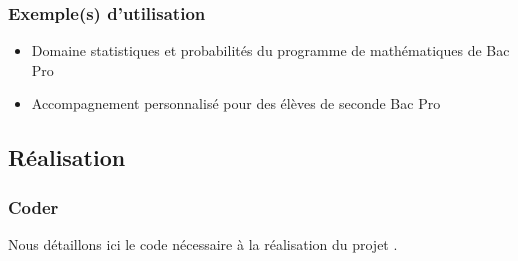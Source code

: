 \documentclass[letterpaper,10pt,french]{sphinxmanual}
\begin{document}
\subsubsection{Exemple(s) d’utilisation}
\label{\detokenize{projets/galton:exemple-s-d-utilisation}}\begin{itemize}
\item {} 
Domaine statistiques et probabilités du programme de mathématiques de Bac Pro

\item {} 
Accompagnement personnalisé pour des élèves de seconde Bac Pro

\end{itemize}


\subsection{Réalisation}
\label{\detokenize{projets/galton:realisation}}
\ignorespaces 

\subsubsection{Coder}
\label{\detokenize{projets/galton-coder:index-0}}\label{\detokenize{projets/galton-coder:coder}}\label{\detokenize{projets/galton-coder::doc}}
Nous détaillons ici le code nécessaire à la réalisation
du projet {\hyperref[\detokenize{projets/galton:projetgalton}]{}}.
\end{document}
